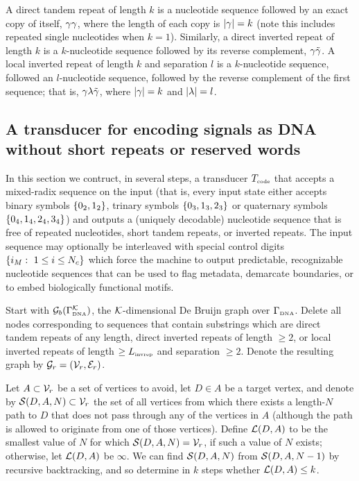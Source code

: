 \documentclass[english]{article}
\begin{document}
A direct tandem repeat of length $k$ is a nucleotide sequence followed by an exact copy of itself, $\gamma \gamma$, where the length of each copy is $|\gamma|=k$
(note this includes repeated single nucleotides when $k=1$).
Similarly, a direct inverted repeat of length $k$ is a $k$-nucleotide sequence followed by its reverse complement, $\gamma \tilde{\gamma}$.
A local inverted repeat of length $k$ and separation $l$ is a $k$-nucleotide sequence, followed an $l$-nucleotide sequence, followed by the reverse complement
of the first sequence; that is, $\gamma \lambda \tilde{\gamma}$, where $|\gamma|=k$ and $|\lambda|=l$.

\subsection{A transducer for encoding signals as DNA without short repeats or reserved words}

In this section we contruct, in several steps, a transducer $T_{\mbox{\tiny code}}$
that accepts a mixed-radix sequence on the input
(that is, every input state either accepts binary symbols $\{ 0_2, 1_2 \}$,
trinary symbols $\{ 0_3, 1_3, 2_3 \}$ or
quaternary symbols $\{ 0_4, 1_4, 2_4, 3_4 \}$)
and outputs a (uniquely decodable) nucleotide sequence that is free of
repeated nucleotides, short tandem repeats, or inverted repeats.
The input sequence may optionally be interleaved with special control digits
$\{ {i}_M:\ 1 \leq i \leq N_c \}$
which force the machine to output predictable, recognizable nucleotide sequences
that can be used to flag metadata, demarcate boundaries,
or to embed biologically functional motifs.

Start with ${\cal G}_b(\Gamma_{\mbox{\tiny DNA}}^{\cal K})$, the ${\cal K}$-dimensional De Bruijn graph over $\Gamma_{\mbox{\tiny DNA}}$.
Delete all nodes corresponding to sequences that contain substrings which are
direct tandem repeats of any length,
direct inverted repeats of length $\geq 2$,
or local inverted repeats of length $\geq L_{\mbox{\tiny invrep}}$ and separation $\geq 2$.
Denote the resulting graph by ${\cal G}_r = ({\cal V}_r,{\cal E}_r)$.

Let $A \subset {\cal V}_r$ be a set of vertices to avoid,
let $D \in A$ be a target vertex,
and denote by ${\cal S}(D,A,N) \subset {\cal V}_r$
the set of all vertices
from which there exists a length-$N$ path to $D$
that does not pass through any of the vertices in $A$
(although the path is allowed to originate from one of those vertices).
Define ${\cal L}(D,A)$ to be the smallest value of $N$ for which ${\cal S}(D,A,N) = {\cal V}_r$,
if such a value of $N$ exists; otherwise, let ${\cal L}(D,A)$ be $\infty$.
We can find ${\cal S}(D,A,N)$ from ${\cal S}(D,A,N-1)$ by recursive backtracking,
and so determine in $k$ steps whether ${\cal L}(D,A) \leq k$.
\end{document}
